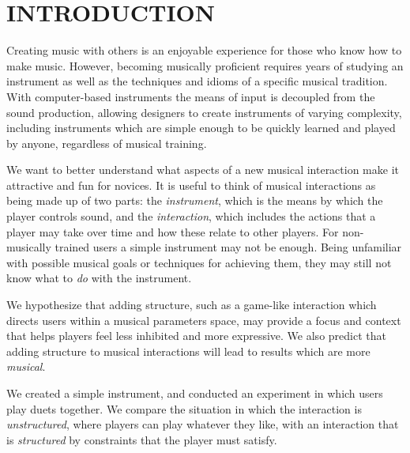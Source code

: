 \documentclass{article}
\begin{document}







\section{INTRODUCTION}
Creating music with others is an enjoyable experience for those who know how to make music. However, becoming musically proficient requires years of studying an instrument as well as the techniques and idioms of a specific musical tradition. With computer-based instruments the means of input is decoupled from the sound production, allowing designers to create instruments of varying complexity, including instruments which are simple enough to be quickly learned and played by anyone, regardless of musical training.

We want to better understand what aspects of a new musical interaction make it attractive and fun for novices.  It is useful to think of musical interactions as being made up of two parts:  the \textit{instrument}, which is the means by which the player controls sound, and the \textit{interaction}, which includes the actions that a player may take over time and how these relate to other players.  For non-musically trained users a simple instrument may not be enough. Being unfamiliar with possible musical goals or techniques for achieving them, they may still not know what to \textit{do} with the instrument.

We hypothesize that adding structure, such as a game-like interaction which directs users within a musical parameters space, may provide a focus and context that helps players feel less inhibited and more expressive.   We also predict that adding structure to musical interactions will lead to results which are more \textit{musical}.

We created a simple instrument, and conducted an experiment in which users play duets together.  We compare the situation in which the interaction is \textit{unstructured}, where players can play whatever they like, with an interaction that is \textit{structured} by constraints that the player must satisfy.
\end{document}
